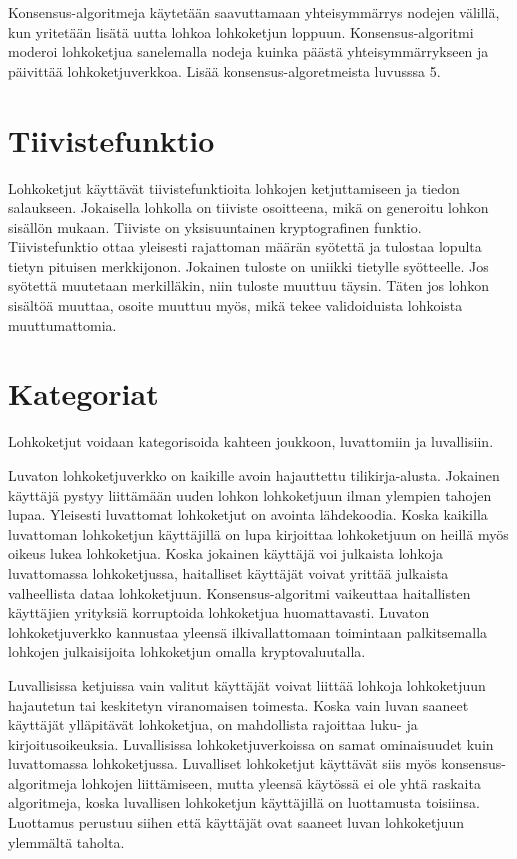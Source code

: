 \documentclass[utf8,bachelor]{gradu3}
\begin{document}
Konsensus-algoritmeja käytetään saavuttamaan yhteisymmärrys nodejen välillä, kun yritetään lisätä uutta lohkoa lohkoketjun loppuun.
Konsensus-algoritmi moderoi lohkoketjua sanelemalla nodeja kuinka päästä yhteisymmärrykseen ja päivittää lohkoketjuverkkoa. Lisää konsensus-algoretmeista luvusssa 5.

\section{Tiivistefunktio}
Lohkoketjut käyttävät tiivistefunktioita lohkojen ketjuttamiseen ja tiedon salaukseen. Jokaisella lohkolla on tiiviste osoitteena, mikä on generoitu lohkon sisällön mukaan. 
Tiiviste on yksisuuntainen kryptografinen funktio.
Tiivistefunktio ottaa yleisesti rajattoman määrän syötettä ja tulostaa lopulta tietyn pituisen merkkijonon. Jokainen tuloste on uniikki tietylle syötteelle.
Jos syötettä muutetaan merkilläkin, niin tuloste muuttuu täysin.
Täten jos lohkon sisältöä muuttaa, osoite muuttuu myös, mikä tekee validoiduista lohkoista muuttumattomia.


\section{Kategoriat}
Lohkoketjut voidaan kategorisoida kahteen joukkoon, luvattomiin ja luvallisiin.

Luvaton lohkoketjuverkko on kaikille avoin hajauttettu tilikirja-alusta. 
Jokainen käyttäjä pystyy liittämään uuden lohkon lohkoketjuun ilman ylempien tahojen lupaa. Yleisesti luvattomat lohkoketjut on avointa lähdekoodia.
Koska kaikilla luvattoman lohkoketjun käyttäjillä on lupa kirjoittaa lohkoketjuun on heillä myös oikeus lukea lohkoketjua.
Koska jokainen käyttäjä voi julkaista lohkoja luvattomassa lohkoketjussa, haitalliset käyttäjät voivat yrittää julkaista valheellista dataa lohkoketjuun.
Konsensus-algoritmi vaikeuttaa haitallisten käyttäjien yrityksiä korruptoida lohkoketjua huomattavasti.
Luvaton lohkoketjuverkko kannustaa yleensä ilkivallattomaan toimintaan palkitsemalla lohkojen julkaisijoita lohkoketjun omalla kryptovaluutalla.

Luvallisissa ketjuissa vain valitut käyttäjät voivat liittää lohkoja lohkoketjuun hajautetun tai keskitetyn viranomaisen toimesta.
Koska vain luvan saaneet käyttäjät ylläpitävät lohkoketjua, on mahdollista rajoittaa luku- ja kirjoitusoikeuksia.
Luvallisissa lohkoketjuverkoissa on samat ominaisuudet kuin luvattomassa lohkoketjussa.
Luvalliset lohkoketjut käyttävät siis myös konsensus-algoritmeja lohkojen liittämiseen, mutta yleensä käytössä ei ole yhtä raskaita algoritmeja, koska luvallisen lohkoketjun käyttäjillä on luottamusta toisiinsa. Luottamus perustuu siihen että käyttäjät ovat saaneet luvan lohkoketjuun ylemmältä taholta.
\end{document}
